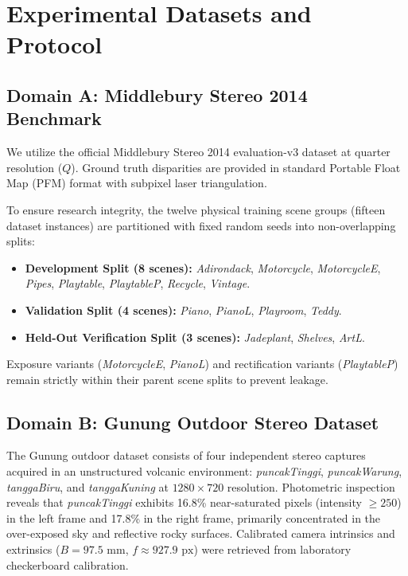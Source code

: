 \documentclass[journal]{IEEEtran}
\begin{document}
\section{Experimental Datasets and Protocol}
\subsection{Domain A: Middlebury Stereo 2014 Benchmark}
We utilize the official Middlebury Stereo 2014 evaluation-v3 dataset \cite{scharstein2014high} at quarter resolution ($Q$). Ground truth disparities are provided in standard Portable Float Map (PFM) format with subpixel laser triangulation.

To ensure research integrity, the twelve physical training scene groups (fifteen dataset instances) are partitioned with fixed random seeds into non-overlapping splits:
\begin{itemize}
    \item \textbf{Development Split (8 scenes):} \textit{Adirondack}, \textit{Motorcycle}, \textit{MotorcycleE}, \textit{Pipes}, \textit{Playtable}, \textit{PlaytableP}, \textit{Recycle}, \textit{Vintage}.
    \item \textbf{Validation Split (4 scenes):} \textit{Piano}, \textit{PianoL}, \textit{Playroom}, \textit{Teddy}.
    \item \textbf{Held-Out Verification Split (3 scenes):} \textit{Jadeplant}, \textit{Shelves}, \textit{ArtL}.
\end{itemize}
Exposure variants (\textit{MotorcycleE}, \textit{PianoL}) and rectification variants (\textit{PlaytableP}) remain strictly within their parent scene splits to prevent leakage.

\subsection{Domain B: Gunung Outdoor Stereo Dataset}
The Gunung outdoor dataset consists of four independent stereo captures acquired in an unstructured volcanic environment: \textit{puncakTinggi}, \textit{puncakWarung}, \textit{tanggaBiru}, and \textit{tanggaKuning} at $1280 \times 720$ resolution. Photometric inspection reveals that \textit{puncakTinggi} exhibits 16.8\% near-saturated pixels (intensity $\ge 250$) in the left frame and 17.8\% in the right frame, primarily concentrated in the over-exposed sky and reflective rocky surfaces. Calibrated camera intrinsics and extrinsics ($B = 97.5\text{ mm}$, $f \approx 927.9\text{ px}$) were retrieved from laboratory checkerboard calibration.
\end{document}
